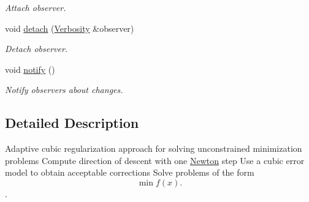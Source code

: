 \begin{DoxyCompactItemize}
\begin{DoxyCompactList}\small\item\em \-Attach observer. \end{DoxyCompactList}\item 
\hypertarget{classSpacy_1_1Mixin_1_1MixinConnection_adda739590c487679c26f60e50aedb73f}{void \hyperlink{classSpacy_1_1Mixin_1_1MixinConnection_adda739590c487679c26f60e50aedb73f}{detach} (\hyperlink{classSpacy_1_1Mixin_1_1Verbosity_aefe2f237b0456c4bced001fbfa75f92e}{\-Verbosity} \&observer)}\label{classSpacy_1_1Mixin_1_1MixinConnection_adda739590c487679c26f60e50aedb73f}

\begin{DoxyCompactList}\small\item\em \-Detach observer. \end{DoxyCompactList}\item 
\hypertarget{classSpacy_1_1Mixin_1_1MixinConnection_a1ddeaa78a3bb4a38c2cca36d1f99fe36}{void \hyperlink{classSpacy_1_1Mixin_1_1MixinConnection_a1ddeaa78a3bb4a38c2cca36d1f99fe36}{notify} ()}\label{classSpacy_1_1Mixin_1_1MixinConnection_a1ddeaa78a3bb4a38c2cca36d1f99fe36}

\begin{DoxyCompactList}\small\item\em \-Notify observers about changes. \end{DoxyCompactList}\end{DoxyCompactItemize}


\subsection{\-Detailed \-Description}
\-Adaptive cubic regularization approach for solving unconstrained minimization problems \-Compute direction of descent with one \hyperlink{namespaceSpacy_1_1Newton}{\-Newton} step \-Use a cubic error model to obtain acceptable corrections \-Solve problems of the form \[\min f(x).\]. 

